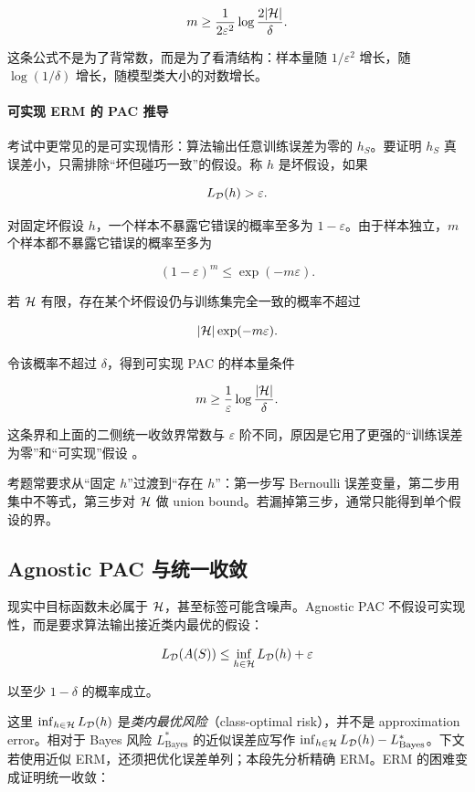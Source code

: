 \documentclass[11pt]{ctexart}
\begin{document}
\[
  m
  \ge
  \frac{1}{2\varepsilon^2}
  \log\frac{2|\mathcal{H}|}{\delta}.
\]

这条公式不是为了背常数，而是为了看清结构：样本量随 \(1/\varepsilon^2\) 增长，随 \(\log(1/\delta)\) 增长，随模型类大小的对数增长。

\paragraph{可实现 ERM 的 PAC 推导}

考试中更常见的是可实现情形：算法输出任意训练误差为零的 \(h_S\)。要证明 \(h_S\) 真误差小，只需排除“坏但碰巧一致”的假设。称 \(h\) 是坏假设，如果

\[
  L_{\mathcal{D}}(h)>\varepsilon.
\]

对固定坏假设 \(h\)，一个样本不暴露它错误的概率至多为 \(1-\varepsilon\)。由于样本独立，\(m\) 个样本都不暴露它错误的概率至多为

\[
  (1-\varepsilon)^m
  \le
  \exp(-m\varepsilon).
\]

若 \(\mathcal{H}\) 有限，存在某个坏假设仍与训练集完全一致的概率不超过

\[
  |\mathcal{H}|\exp(-m\varepsilon).
\]

令该概率不超过 \(\delta\)，得到可实现 PAC 的样本量条件

\[
  m
  \ge
  \frac{1}{\varepsilon}
  \log\frac{|\mathcal{H}|}{\delta}.
\]

这条界和上面的二侧统一收敛界常数与 \(\varepsilon\) 阶不同，原因是它用了更强的“训练误差为零”和“可实现”假设 \parencite{shalev2014uml,mohri2018foundations}。

\begin{examnote}
考题常要求从“固定 \(h\)”过渡到“存在 \(h\)”：第一步写 Bernoulli 误差变量，第二步用集中不等式，第三步对 \(\mathcal{H}\) 做 union bound。若漏掉第三步，通常只能得到单个假设的界。
\end{examnote}


\subsection{Agnostic PAC 与统一收敛}


\begin{definition}
现实中目标函数未必属于 \(\mathcal{H}\)，甚至标签可能含噪声。Agnostic PAC 不假设可实现性，而是要求算法输出接近类内最优的假设：

\[
  L_{\mathcal{D}}(A(S))
  \le
  \inf_{h\in\mathcal{H}}L_{\mathcal{D}}(h)+\varepsilon
\]

以至少 \(1-\delta\) 的概率成立。
\end{definition}
这里 \(\inf_{h\in\mathcal{H}}L_{\mathcal{D}}(h)\) 是\emph{类内最优风险}（class-optimal risk），并不是 approximation error。相对于 Bayes 风险 \(L^*_{\mathrm{Bayes}}\) 的近似误差应写作 \(\inf_{h\in\mathcal{H}}L_{\mathcal{D}}(h)-L^*_{\mathrm{Bayes}}\)。下文若使用近似 ERM，还须把优化误差单列；本段先分析精确 ERM。ERM 的困难变成证明统一收敛：
\end{document}

